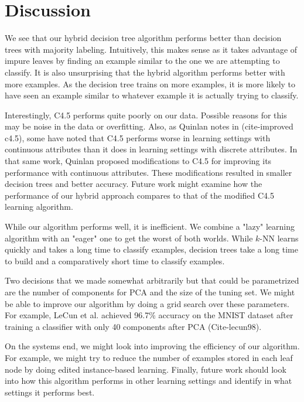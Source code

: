 \section{Discussion}

We see that our hybrid decision tree algorithm performs better than decision trees with majority labeling. Intuitively, this makes sense as it takes advantage of impure leaves by finding an example similar to the one we are attempting to classify. It is also unsurprising that the hybrid algorithm performs better with more examples. As the decision tree trains on more examples, it is more likely to have seen an example similar to whatever example it is actually trying to classify.

Interestingly, C4.5 performs quite poorly on our data. Possible reasons for this may be noise in the data or overfitting. Also, as Quinlan notes in (cite-improved c4.5), some have noted that C4.5 performs worse in learning settings with continuous attributes than it does in learning settings with discrete attributes. In that same work, Quinlan proposed modifications to C4.5 for improving its performance with continuous attributes. These modifications resulted in smaller decision trees and better accuracy. Future work might examine how the performance of our hybrid approach compares to that of the modified C4.5 learning algorithm.

While our algorithm performs well, it is inefficient. We combine a "lazy" learning algorithm with an "eager" one to get the worst of both worlds. While $k$-NN learns quickly and takes a long time to classify examples, decision trees take a long time to build and a comparatively short time to classify examples.

Two decisions that we made somewhat arbitrarily but that could be parametrized are the number of components for PCA and the size of the tuning set. We might be able to improve our algorithm by doing a grid search over these parameters. For example, LeCun et al. achieved 96.7\% accuracy on the MNIST dataset after training a classifier with only 40 components after PCA (Cite-lecun98).

On the systems end, we might look into improving the efficiency of our algorithm. For example, we might try to reduce the number of examples stored in each leaf node by doing edited instance-based learning.
Finally, future work should look into how this algorithm performs in other learning settings and identify in what settings it performs best.
